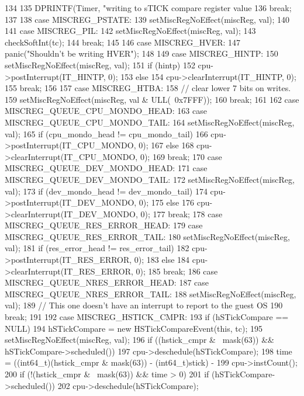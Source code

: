 \begin{DoxyCode}
{{{134         }
135         DPRINTF(Timer, "writing to sTICK compare register value %
136         break;
137 
138       case MISCREG_PSTATE:
139         setMiscRegNoEffect(miscReg, val);
140 
141       case MISCREG_PIL:
142         setMiscRegNoEffect(miscReg, val);
143         checkSoftInt(tc);
144         break;
145 
146       case MISCREG_HVER:
147         panic("Shouldn't be writing HVER\n");
148 
149       case MISCREG_HINTP:
150         setMiscRegNoEffect(miscReg, val);
151         if (hintp)
152             cpu->postInterrupt(IT_HINTP, 0);
153         else
154             cpu->clearInterrupt(IT_HINTP, 0);
155         break;
156 
157       case MISCREG_HTBA:
158         // clear lower 7 bits on writes.
159         setMiscRegNoEffect(miscReg, val & ULL(~0x7FFF));
160         break;
161 
162       case MISCREG_QUEUE_CPU_MONDO_HEAD:
163       case MISCREG_QUEUE_CPU_MONDO_TAIL:
164         setMiscRegNoEffect(miscReg, val);
165         if (cpu_mondo_head != cpu_mondo_tail)
166             cpu->postInterrupt(IT_CPU_MONDO, 0);
167         else
168             cpu->clearInterrupt(IT_CPU_MONDO, 0);
169         break;
170       case MISCREG_QUEUE_DEV_MONDO_HEAD:
171       case MISCREG_QUEUE_DEV_MONDO_TAIL:
172         setMiscRegNoEffect(miscReg, val);
173         if (dev_mondo_head != dev_mondo_tail)
174             cpu->postInterrupt(IT_DEV_MONDO, 0);
175         else
176             cpu->clearInterrupt(IT_DEV_MONDO, 0);
177         break;
178       case MISCREG_QUEUE_RES_ERROR_HEAD:
179       case MISCREG_QUEUE_RES_ERROR_TAIL:
180         setMiscRegNoEffect(miscReg, val);
181         if (res_error_head != res_error_tail)
182             cpu->postInterrupt(IT_RES_ERROR, 0);
183         else
184             cpu->clearInterrupt(IT_RES_ERROR, 0);
185         break;
186       case MISCREG_QUEUE_NRES_ERROR_HEAD:
187       case MISCREG_QUEUE_NRES_ERROR_TAIL:
188         setMiscRegNoEffect(miscReg, val);
189         // This one doesn't have an interrupt to report to the guest OS
190         break;
191 
192       case MISCREG_HSTICK_CMPR:
193         if (hSTickCompare == NULL)
194             hSTickCompare = new HSTickCompareEvent(this, tc);
195         setMiscRegNoEffect(miscReg, val);
196         if ((hstick_cmpr & ~mask(63)) && hSTickCompare->scheduled())
197             cpu->deschedule(hSTickCompare);
198         time = ((int64_t)(hstick_cmpr & mask(63)) - (int64_t)stick) -
199             cpu->instCount();
200         if (!(hstick_cmpr & ~mask(63)) && time > 0) {
201             if (hSTickCompare->scheduled())
202                 cpu->deschedule(hSTickCompare);
}}}
\end{DoxyCode}
